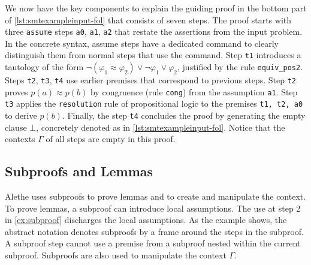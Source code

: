 We now have the key components to explain the guiding proof in the bottom part of \cref{lst:smtexampleinput-fol} that consists of seven steps. The proof starts with three \texttt{assume} steps \texttt{a0}, \texttt{a1}, \texttt{a2} that restate the assertions from the input problem.
In the concrete syntax, assume steps have a dedicated command  to clearly distinguish them from normal steps that use the  command.
Step \texttt{t1} introduces a tautology of the form $\neg (\varphi_1 \approx \varphi_2) \lor \neg \varphi_1 \lor \varphi_2$, justified by the rule \colorbox{rxpurple2!30}{\texttt{equiv\_pos2}}. Steps \texttt{t2}, \texttt{t3}, \texttt{t4} use earlier premises that correspond to previous steps.
Step \texttt{t2} proves $p(a) \approx p(b)$ by congruence (rule \colorbox{rxpurple2!30}{\texttt{cong}}) from the assumption \texttt{a1}.
Step \texttt{t3} applies the \colorbox{rxpurple2!30}{\texttt{resolution}} rule of propositional logic to the premises \texttt{t1, t2, a0} to derive $p(b)$. Finally, the step \texttt{t4} concludes the proof by generating the empty clause $\bot$, concretely denoted as  in \cref{lst:smtexampleinput-fol}. %
Notice that the contexts \colorbox{RoyalBlue!30}{$\Gamma$} of all steps are empty in this proof.

\subsection{Subproofs and Lemmas}
\label{ssec:subproof-desc}

Alethe uses subproofs to prove lemmas and to create and manipulate the context. To prove lemmas, a subproof can introduce
local assumptions. The  use at step 2 in \cref{ex:subproof} discharges the local assumptions.
As the example shows, the abstract notation denotes subproofs by a frame around the steps in the subproof.
A subproof step cannot use a premise from a subproof nested within the current subproof.
Subproofs are also used to manipulate the context \colorbox{RoyalBlue!30}{$\Gamma$}.

